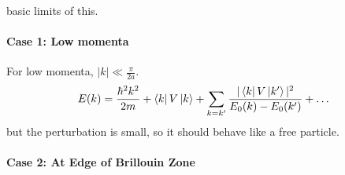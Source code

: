 \documentclass{article}
\theoremstyle{definition}
\begin{document}
basic limits of this. \paragraph{Case 1: Low momenta}For low momenta, $|k|\ll\frac{\pi}{2a}$. \begin{equation} E(k)=\frac{\hbar^2 k^2}{2m}+\bra{k}V\ket{k}+\sum_{k=k'}\frac{|\bra{k}V\ket{k'}|^2}{E_0(k)-E_0(k')}+\dots \end{equation} but the perturbation is small, so it should behave like a free particle. \paragraph{Case 2: At Edge of Brillouin Zone}
\end{document}
